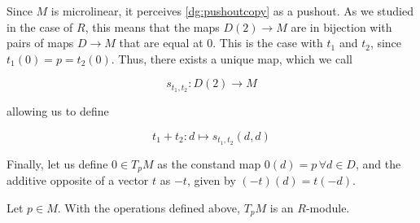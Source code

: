 Since \( M \) is microlinear, it perceives \ref{dg:pushoutcopy} as a pushout. As we studied in the case of \( R \), this means that the maps \( D(2)\to M \) are in bijection with pairs of maps \( D\to M \) that are equal at \( 0 \). This is the case with \( t_1 \) and \( t_2 \), since \( t_1(0)=p=t_2(0) \). Thus, there exists a unique map, which we call

\begin{equation*}
  s_{t_1,t_2}:D(2)\to M
\end{equation*}

allowing us to define

\begin{equation*}
  t_1+t_2:d\mapsto s_{t_1,t_2}(d,d)
\end{equation*}

Finally, let us define \( 0\in T_pM \) as the constand map \( 0(d)=p \,\forall d\in D \), and the additive opposite of a vector \( t \) as \( -t \), given by \( (-t)(d) = t(-d) \).

\begin{proposition}
  Let \( p\in M \). With the operations defined above, \( T_pM \) is an \( R \)-module.
\end{proposition}

